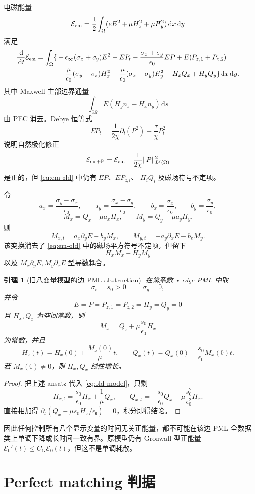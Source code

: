 \documentclass[UTF8,a4paper,11pt]{ctexart}
\newtheorem{lemma}{引理}
\newcommand{\dd}{\,\mathrm d}
\newcommand{\Om}{\Omega}
\newcommand{\sx}{\sigma_x}
\newcommand{\sy}{\sigma_y}
\newcommand{\Ecal}{\mathcal E}
\begin{document}
电磁能量
\[
\Ecal_{\rm em}
=\frac12\int_\Om(eE^2+\mu H_x^2+\mu H_y^2)\dd x\dd y
\]
满足
\begin{align}
\frac{\dd}{\dd t}\Ecal_{\rm em}
=\int_\Om\{&
-\epsilon_\infty(\sx+\sy)E^2
-EP_t-\frac{\sx+\sy}{\epsilon_0}EP+E(P_{z,1}+P_{z,2}) \notag\\
&-\frac{\mu}{\epsilon_0}(\sy-\sx)H_x^2
-\frac{\mu}{\epsilon_0}(\sx-\sy)H_y^2
+H_xQ_x+H_yQ_y\}\dd x\dd y .
\label{eq:em-old}
\end{align}
其中 Maxwell 主部边界通量
\[
\int_{\partial\Om}E(H_y n_x-H_x n_y)\dd s
\]
由 PEC 消去。Debye 恒等式
\[
EP_t=\frac1{2\chi}\partial_t(P^2)+\frac{\tau}{\chi}P_t^2
\]
说明自然极化修正
\[
\Ecal_{\rm em+P}=\Ecal_{\rm em}+\frac1{2\chi}\|P\|_{L^2(\Om)}^2
\]
是正的，但 \eqref{eq:em-old} 中仍有 \(EP\)、\(EP_{z,i}\)、
\(H_iQ_i\) 及磁场符号不定项。

令
\[
a_x=\frac{\sy-\sx}{\epsilon_0},\qquad
a_y=\frac{\sx-\sy}{\epsilon_0},\qquad
b_x=\frac{\sx}{\epsilon_0},\qquad
b_y=\frac{\sy}{\epsilon_0},
\]
\[
M_x=Q_x-\mu a_xH_x,\qquad M_y=Q_y-\mu a_yH_y.
\]
则
\[
M_{x,t}=a_x\partial_yE-b_yM_x,\qquad
M_{y,t}=-a_y\partial_xE-b_xM_y.
\]
该变换消去了 \eqref{eq:em-old} 中的磁场平方符号不定项，但留下
\[
H_xM_x+H_yM_y
\]
以及 \(M_x\partial_yE,M_y\partial_xE\) 型导数耦合。

\begin{lemma}[旧八变量模型的边 PML obstruction]
在常系数 \(x\)-edge PML 中取
\[
\sx=s_0>0,\qquad \sy=0,
\]
并令
\[
E=P=P_{z,1}=P_{z,2}=H_y=Q_y=0
\]
且 \(H_x,Q_x\) 为空间常数，则
\[
M_x=Q_x+\mu\frac{s_0}{\epsilon_0}H_x
\]
为常数，并且
\[
H_x(t)=H_x(0)+\frac{M_x(0)}{\mu}t,\qquad
Q_x(t)=Q_x(0)-\frac{s_0}{\epsilon_0}M_x(0)t.
\]
若 \(M_x(0)\ne0\)，则 \(H_x,Q_x\) 线性增长。
\end{lemma}

\begin{proof}
把上述 ansatz 代入 \eqref{eq:old-model}，只剩
\[
H_{x,t}=\frac{s_0}{\epsilon_0}H_x+\frac1\mu Q_x,\qquad
Q_{x,t}=-\frac{s_0}{\epsilon_0}Q_x-\mu\frac{s_0^2}{\epsilon_0^2}H_x.
\]
直接相加得
\(\partial_t(Q_x+\mu s_0H_x/\epsilon_0)=0\)，积分即得结论。
\end{proof}

因此任何控制所有八个显示变量的时间无关正能量，都不可能在该边 PML
全数据类上单调下降或长时间一致有界。原模型仍有 Gronwall 型正能量
\(\Ecal_0'(t)\le C_G\Ecal_0(t)\)，但这不是单调耗散。

\section{Perfect matching 判据}
\end{document}
